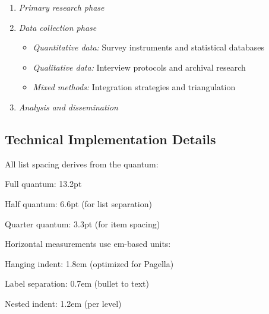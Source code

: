 \documentclass[11pt]{article}
\begin{document}
\begin{enumerate}
\item \emph{Primary research phase}
  
\item \emph{Data collection phase}
  \begin{itemize}
  \item \emph{Quantitative data:} Survey instruments and statistical databases
  \item \emph{Qualitative data:} Interview protocols and archival research
  \item \emph{Mixed methods:} Integration strategies and triangulation
  \end{itemize}
  
\item \emph{Analysis and dissemination}
\end{enumerate}

\subsection{Technical Implementation Details}

 All list spacing derives from the quantum:
\begin{compactitem}
\item Full quantum: 13.2pt
\item Half quantum: 6.6pt (for list separation)
\item Quarter quantum: 3.3pt (for item spacing)
\end{compactitem}

 Horizontal measurements use em-based units:
\begin{compactitem}
\item Hanging indent: 1.8em (optimized for Pagella)
\item Label separation: 0.7em (bullet to text)
\item Nested indent: 1.2em (per level)
\end{compactitem}
\end{document}
